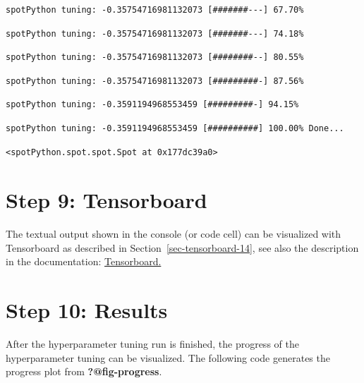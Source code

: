 \documentclass[
  letterpaper,
  DIV=11,
  numbers=noendperiod]{scrreprt}
\begin{document}
\begin{verbatim}
spotPython tuning: -0.35754716981132073 [#######---] 67.70% 
\end{verbatim}

\begin{verbatim}
spotPython tuning: -0.35754716981132073 [#######---] 74.18% 
\end{verbatim}

\begin{verbatim}
spotPython tuning: -0.35754716981132073 [########--] 80.55% 
\end{verbatim}

\begin{verbatim}
spotPython tuning: -0.35754716981132073 [#########-] 87.56% 
\end{verbatim}

\begin{verbatim}
spotPython tuning: -0.3591194968553459 [#########-] 94.15% 
\end{verbatim}

\begin{verbatim}
spotPython tuning: -0.3591194968553459 [##########] 100.00% Done...
\end{verbatim}

\begin{verbatim}
<spotPython.spot.spot.Spot at 0x177dc39a0>
\end{verbatim}

\hypertarget{sec-tensorboard-16}{%
\section{Step 9: Tensorboard}\label{sec-tensorboard-16}}

The textual output shown in the console (or code cell) can be visualized
with Tensorboard as described in Section~\ref{sec-tensorboard-14}, see
also the description in the documentation:
\href{https://sequential-parameter-optimization.github.io/spotPython/14_spot_ray_hpt_torch_cifar10.html\#sec-tensorboard-14}{Tensorboard.}

\hypertarget{sec-results-tuning-16}{%
\section{Step 10: Results}\label{sec-results-tuning-16}}

After the hyperparameter tuning run is finished, the progress of the
hyperparameter tuning can be visualized. The following code generates
the progress plot from \textbf{?@fig-progress}.
\end{document}
